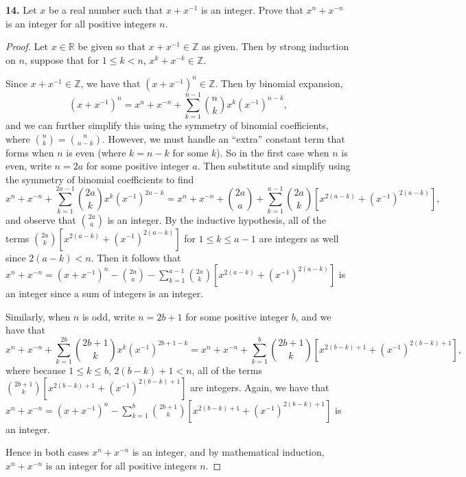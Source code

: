\documentclass[11pt]{article}
\begin{document}
\textbf{14.} Let $x$ be a real number such that $x+x^{-1}$ is an integer. Prove that $x^n+x^{-n}$ is an integer for all positive integers $n$.
\begin{proof}
    Let $x\in \mathbb{R}$ be given so that $x+x^{-1}\in \mathbb{Z}$ as given. Then by strong induction on $n$, suppose that for $1\leq k < n$, $x^k+x^{-k}\in \mathbb{Z}$.

    Since $x+x^{-1}\in \mathbb{Z}$, we have that $(x+x^{-1})^n \in \mathbb{Z}$. Then by binomial expansion, 
    \[(x+x^{-1})^n = x^n+x^{-n} + \sum_{k=1}^{n-1} \binom{n}{k}x^k(x^{-1})^{n-k},\]
    and we can further simplify this using the symmetry of binomial coefficients, where $\binom{n}{k} = \binom{n}{n-k}$. However, we must handle an ``extra'' constant term that forms when $n$ is even (where $k=n-k$ for some $k$). So in the first case when $n$ is even, write $n = 2a$ for some positive integer $a$. Then substitute and simplify using the symmetry of binomial coefficients to find 
    \[x^n+x^{-n} + \sum_{k=1}^{2a-1} \binom{2a}{k}x^k(x^{-1})^{2a-k} = x^n+x^{-n} + \binom{2a}{a} + \sum_{k=1}^{a-1} \binom{2a}{k}\left[x^{2(a-k)} + (x^{-1})^{2(a-k)}\right],\]
    and observe that $\binom{2a}{a}$ is an integer. By the inductive hypothesis, all of the terms $\binom{2a}{k}\left[x^{2(a-k)} + (x^{-1})^{2(a-k)}\right]$ for $1\leq k \leq a-1$ are integers as well since $2(a-k) < n$. Then it follows that $x^n+x^{-n} = (x+x^{-1})^n - \binom{2a}{a} - \sum_{k=1}^{a-1} \binom{2a}{k}\left[x^{2(a-k)} + (x^{-1})^{2(a-k)}\right]$ is an integer since a sum of integers is an integer.

    Similarly, when $n$ is odd, write $n=2b+1$ for some positive integer $b$, and we have that 
    \[x^n+x^{-n} + \sum_{k=1}^{2b} \binom{2b+1}{k}x^k(x^{-1})^{2b+1-k} = x^n+x^{-n} + \sum_{k=1}^{b} \binom{2b+1}{k}\left[x^{2(b-k)+1} + (x^{-1})^{2(b-k)+1}\right],\]
    where because $1\leq k\leq b$, $2(b-k)+1 < n$, all of the terms $\binom{2b+1}{k}\left[x^{2(b-k)+1} + (x^{-1})^{2(b-k)+1}\right]$ are integers. Again, we have that $x^n+x^{-n} = (x+x^{-1})^n - \sum_{k=1}^{b} \binom{2b+1}{k}\left[x^{2(b-k)+1} + (x^{-1})^{2(b-k)+1}\right]$ is an integer.

    Hence in both cases $x^n+x^{-n}$ is an integer, and by mathematical induction, $x^n+x^{-n}$ is an integer for all positive integers $n$.
\end{proof}
\end{document}
